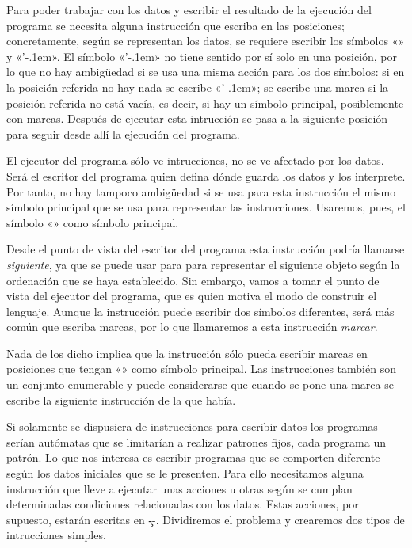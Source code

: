 Para poder trabajar con los datos y escribir el resultado de la ejecución del programa se necesita
alguna instrucción que escriba en las posiciones; concretamente, según se representan los datos, se
requiere escribir los símbolos «» y «{\fcodej’\kern-.1em}». El símbolo
«{\fcodej’\kern-.1em}» no tiene sentido por sí solo en una posición, por lo que no hay ambigüedad
si se usa una misma acción para los dos símbolos: si en la posición referida no hay nada se escribe
«{\fcodej’\kern-.1em}»; se escribe una marca si la posición referida no está vacía, es decir, si
hay un símbolo principal, posiblemente con marcas. Después de ejecutar esta intrucción se pasa a la
siguiente posición para seguir desde allí la ejecución del programa.

El ejecutor del programa sólo ve intrucciones, no se ve afectado por los datos. Será el escritor del
programa quien defina dónde guarda los datos y los interprete. Por tanto, no hay tampoco ambigüedad
si se usa para esta instrucción el mismo símbolo principal que se usa para representar las
instrucciones. Usaremos, pues, el símbolo «» como símbolo principal.

Desde el punto de vista del escritor del programa esta instrucción podría llamarse {\it siguiente},
ya que se puede usar para para representar el siguiente objeto según la ordenación que se haya
establecido. Sin embargo, vamos a tomar el punto de vista del ejecutor del programa, que es quien
motiva el modo de construir el lenguaje. Aunque la instrucción puede escribir dos símbolos
diferentes, será más común que escriba marcas, por lo que llamaremos a esta instrucción {\it
marcar}.

Nada de los dicho implica que la instrucción sólo pueda escribir marcas en posiciones que tengan
«» como símbolo principal. Las instrucciones también son un conjunto enumerable y puede
considerarse que cuando se pone una marca se escribe la siguiente instrucción de la que había.

Si solamente se dispusiera de instrucciones para escribir datos los programas serían autómatas que
se limitarían a realizar patrones fijos, cada programa un patrón. Lo que nos interesa es escribir
programas que se comporten diferente según los datos iniciales que se le presenten. Para ello
necesitamos alguna instrucción que lleve a ejecutar unas acciones u otras según se cumplan
determinadas condiciones relacionadas con los datos. Estas acciones, por supuesto, estarán escritas
en \c--. Dividiremos el problema y crearemos dos tipos de intrucciones simples.

